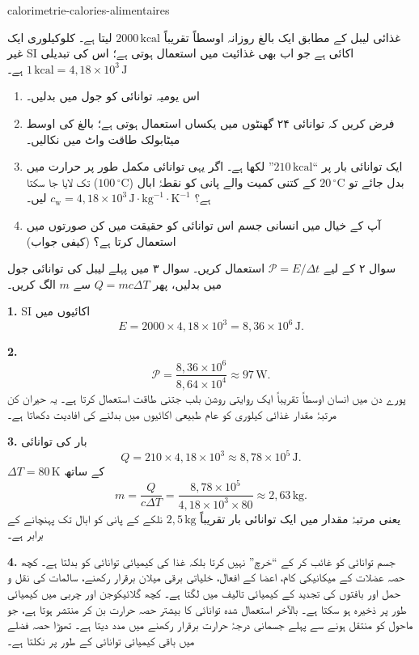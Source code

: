 \begin{exo}{calorimetrie-calories-alimentaires}

غذائی لیبل کے مطابق ایک بالغ روزانہ اوسطاً تقریباً $2000\,\text{kcal}$ لیتا ہے۔ کلوکیلوری ایک غیر SI اکائی ہے جو اب بھی غذائیت میں استعمال ہوتی ہے؛ اس کی تبدیلی $1\,\text{kcal}=4{,}18\times10^3\,\text{J}$ ہے۔

\begin{enumerate}
  \item اس یومیہ توانائی کو جول میں بدلیں۔
  \item فرض کریں کہ توانائی ۲۴ گھنٹوں میں یکساں استعمال ہوتی ہے؛ بالغ کی اوسط میٹابولک طاقت واٹ میں نکالیں۔
  \item ایک توانائی بار پر ``$210\,\text{kcal}$'' لکھا ہے۔ اگر یہی توانائی مکمل طور پر حرارت میں بدل جائے تو $20\,{}^\circ\text{C}$ کے کتنی کمیت والے پانی کو نقطۂ ابال ($100\,{}^\circ\text{C}$) تک لایا جا سکتا ہے؟ $c_{\mathrm{w}}=4{,}18\times10^3\,\text{J}\!\cdot\!\text{kg}^{-1}\!\cdot\!\text{K}^{-1}$ لیں۔
  \item آپ کے خیال میں انسانی جسم اس توانائی کو حقیقت میں کن صورتوں میں استعمال کرتا ہے؟ (کیفی جواب)
\end{enumerate}

\begin{indication}
سوال ۲ کے لیے $\mathcal P=E/\Delta t$ استعمال کریں۔ سوال ۳ میں پہلے لیبل کی توانائی جول میں بدلیں، پھر $Q=mc\Delta T$ سے $m$ الگ کریں۔
\end{indication}

\begin{solution}
\textbf{1.} SI اکائیوں میں
\[
E=2000\times4{,}18\times10^3=8{,}36\times10^6\,\text{J}.
\]

\textbf{2.}
\[
\mathcal P=\frac{8{,}36\times10^6}{8{,}64\times10^4}\approx97\,\text{W}.
\]
پورے دن میں انسان اوسطاً تقریباً ایک روایتی روشن بلب جتنی طاقت استعمال کرتا ہے۔ یہ حیران کن مرتبۂ مقدار غذائی کیلوری کو عام طبیعی اکائیوں میں بدلنے کی افادیت دکھاتا ہے۔

\textbf{3.} بار کی توانائی
\[
Q=210\times4{,}18\times10^3\approx8{,}78\times10^5\,\text{J}.
\]
$\Delta T=80\,\text{K}$ کے ساتھ
\[
m=\frac{Q}{c\Delta T}
=\frac{8{,}78\times10^5}{4{,}18\times10^3\times80}
\approx2{,}63\,\text{kg}.
\]
یعنی مرتبۂ مقدار میں ایک توانائی بار تقریباً $2{,}5\,\text{kg}$ نلکے کے پانی کو ابال تک پہنچانے کے برابر ہے۔

\textbf{4.} جسم توانائی کو غائب کر کے ``خرچ'' نہیں کرتا بلکہ غذا کی کیمیائی توانائی کو بدلتا ہے۔ کچھ حصہ عضلات کے میکانیکی کام، اعضا کے افعال، خلیاتی برقی میلان برقرار رکھنے، سالمات کی نقل و حمل اور بافتوں کی تجدید کے کیمیائی تالیف میں لگتا ہے۔ کچھ گلائیکوجن اور چربی میں کیمیائی طور پر ذخیرہ ہو سکتا ہے۔ بالآخر استعمال شدہ توانائی کا بیشتر حصہ حرارت بن کر منتشر ہوتا ہے، جو ماحول کو منتقل ہونے سے پہلے جسمانی درجۂ حرارت برقرار رکھنے میں مدد دیتا ہے۔ تھوڑا حصہ فضلے میں باقی کیمیائی توانائی کے طور پر نکلتا ہے۔
\end{solution}
\end{exo}
